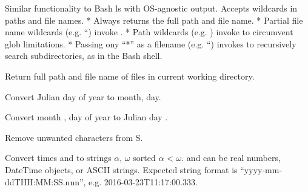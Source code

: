 \documentclass[letterpaper,11pt,english]{sphinxmanual}
\begin{document}
Similar functionality to Bash ls with OS-agnostic output. Accepts wildcards in paths and file names.
* Always returns the full path and file name.
* Partial file name wildcards (e.g. “) invoke .
* Path wildcards (e.g. ) invoke  to circumvent glob limitations.
* Passing ony “*” as a filename (e.g. “) invokes  to recursively search subdirectories, as in the Bash shell.

\begin{fulllineitems}
\end{fulllineitems}


Return full path and file name of files in current working directory.

\begin{fulllineitems}
\label{\detokenize{src/Appendices/function_list:j2md}}
\end{fulllineitems}


Convert Julian day  of year  to month, day.

\begin{fulllineitems}
\label{\detokenize{src/Appendices/function_list:md2j}}
\end{fulllineitems}


Convert month , day  of year  to Julian day .

Remove unwanted characters from S.

\begin{fulllineitems}
\label{\detokenize{src/Appendices/function_list:parsetimewin}}
\end{fulllineitems}


Convert times  and  to strings \(\alpha\), \(\omega\) sorted \(\alpha\) \textless{} \(\omega\).
 and  can be real numbers, DateTime objects, or ASCII strings.
Expected string format is “yyyy-mm-ddTHH:MM:SS.nnn”, e.g. 2016-03-23T11:17:00.333.
\end{document}
